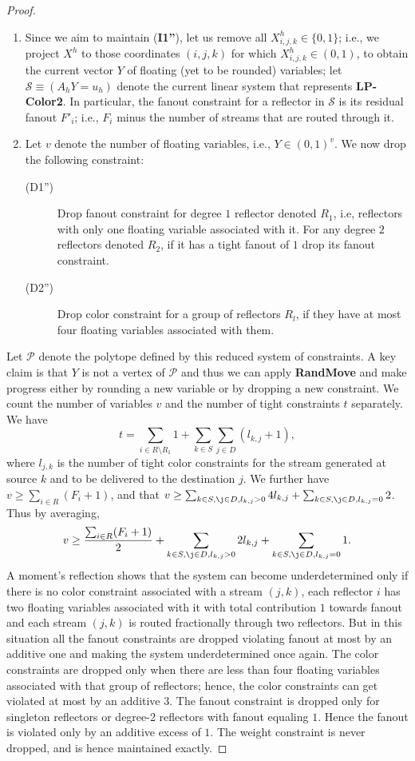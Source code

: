 \begin{proof}
\begin{enumerate}
\item Since we aim to maintain ({\bf I1''}), let us remove all $X_{i,j,k}^{h} \in \{0,1\}$; i.e.,
we project $X^{h}$ to those coordinates $(i,j,k)$ for which $X_{i,j,k}^{h} \in (0,1)$, to obtain the
current vector $Y$ of floating (yet to be rounded) variables; let $\mathcal{S}\equiv(A_{h}Y=u_{h})$ denote
the current linear system that represents {\bf LP-Color2}. In particular, the fanout constraint
for a reflector in $\mathcal{S}$ is its residual fanout $F'_{i}$; i.e., $F_{i}$ minus the
number of streams that are routed through it.
\item Let $v$ denote the number of floating variables, i.e., $Y\in (0,1)^{v}$. We now drop the following constraint:
    \begin{description}
    \item[(D1'')] Drop fanout constraint for degree $1$ reflector denoted $R_1$, i.e, reflectors with only one floating variable associated with it. For any degree $2$ reflectors denoted $R_2$, if
        it has a tight fanout of $1$ drop its fanout constraint.
    \item[(D2'')] Drop color constraint for a group of reflectors $R_{l}$, if they have at most four floating variables associated with them.
    \end{description}
    \end{enumerate}
Let $\mathcal{P}$ denote the polytope defined by this reduced system of constraints.
A key claim is that $Y$ is not a vertex of $\mathcal{P}$ and thus we can apply
{\bf RandMove} and make progress either by rounding a new variable or by dropping
a new constraint. We count the number of variables $v$ and the number of tight constraints
 $t$ separately. We have $$t=\sum_{i \in R \setminus R_1} 1+\sum_{k \in S}\sum_{j \in D}(l_{k,j}+1),$$ where
 $l_{j,k}$ is the number of tight color constraints for the stream generated at source $k$
 and to be delivered to the  destination $j$.  We further have $v \geq \sum_{i \in R} (F_i +1)$, and that
$v \geq \sum_{k \in S, \j \in D, l_{k,j} > 0} 4l_{k,j} + \sum_{k \in S, \j \in D, l_{k,j}= 0} 2$. Thus by averaging, $$v \geq \frac{\sum_{i \in R} (F_i +1)}{2}+  \sum_{k \in S, \j \in D, l_{k,j} > 0} 2l_{k,j}+\sum_{k \in S, \j \in D, l_{k,j}= 0} 1.$$ A moment's reflection shows that the
 system can become underdetermined only if there is no color constraint associated with a stream $(j,k)$, each reflector $i$ has two floating variables associated with it with total contribution $1$ towards fanout and each stream $(j,k)$ is routed fractionally through two reflectors. But in this situation all the fanout constraints are dropped violating fanout at most by an additive one and making the system underdetermined once again.
The color constraints are dropped only when there are less than four
floating variables associated with that group  of reflectors; hence, the color constraints can get violated at most by an additive $3$. The fanout constraint is dropped only for singleton reflectors or degree-2 reflectors with fanout equaling $1$. Hence the fanout is violated only by an additive
excess of $1$. The weight constraint is never dropped, and
is hence maintained exactly.
\end{proof}
